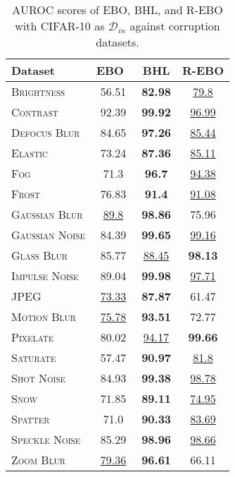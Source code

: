 \documentclass[10pt,twocolumn,a4paper]{article}
\begin{document}
\begin{table}[t]
    \centering
    \setlength{\tabcolsep}{6pt}
    \renewcommand{\arraystretch}{1.2}
    \begin{tabular}{l@{\hskip 0.3in}ccc}
        \toprule
        \textbf{Dataset} & \textbf{EBO}~\cite{liu2020energy} & \textbf{BHL} & \textbf{R-EBO} \\
        \midrule
        \textsc{Brightness}          & 56.51 & \textbf{82.98} & \underline{79.8} \\
        \textsc{Contrast}            & 92.39 & \textbf{99.92} & \underline{96.99} \\
        \textsc{Defocus Blur}        & 84.65 & \textbf{97.26} & \underline{85.44} \\
        \textsc{Elastic}             & 73.24 & \textbf{87.36} & \underline{85.11} \\
        \textsc{Fog}                 & 71.3  & \textbf{96.7}  & \underline{94.38} \\
        \textsc{Frost}               & 76.83 & \textbf{91.4}  & \underline{91.08} \\
        \textsc{Gaussian Blur}       & \underline{89.8}  & \textbf{98.86} & 75.96 \\
        \textsc{Gaussian Noise}      & 84.39 & \textbf{99.65} & \underline{99.16} \\
        \textsc{Glass Blur}          & 85.77 & \underline{88.45} & \textbf{98.13} \\
        \textsc{Impulse Noise}       & 89.04 & \textbf{99.98} & \underline{97.71} \\
        \textsc{JPEG}                & \underline{73.33} & \textbf{87.87} & 61.47 \\
        \textsc{Motion Blur}         & \underline{75.78} & \textbf{93.51} & 72.77 \\
        \textsc{Pixelate}            & 80.02 & \underline{94.17} & \textbf{99.66} \\
        \textsc{Saturate}            & 57.47 & \textbf{90.97} & \underline{81.8} \\
        \textsc{Shot Noise}          & 84.93 & \textbf{99.38} & \underline{98.78} \\
        \textsc{Snow}                & 71.85 & \textbf{89.11} & \underline{74.95} \\
        \textsc{Spatter}             & 71.0  & \textbf{90.33} & \underline{83.69} \\
        \textsc{Speckle Noise}       & 85.29 & \textbf{98.96} & \underline{98.66} \\
        \textsc{Zoom Blur}           & \underline{79.36} & \textbf{96.61} & 66.11 \\
        \bottomrule
    \end{tabular}
    \caption{AUROC scores of EBO, BHL, and R-EBO with CIFAR-10 as $\mathcal{D}_{in}$ against corruption datasets.}
    \label{tab:corruption}
\end{table}
    
\end{document}
